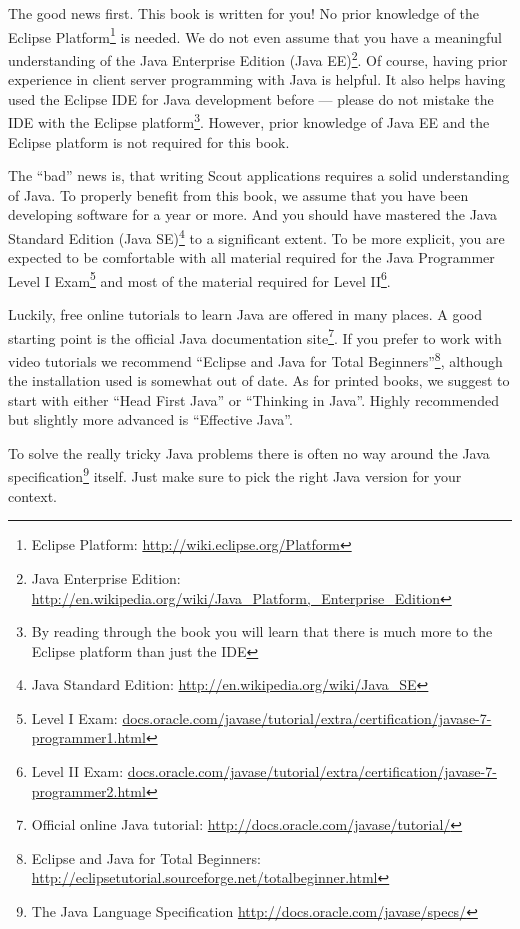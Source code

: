 \documentclass[a4paper,10pt,twoside]{book}
\begin{document}
The good news first.
This book is written for you! 
No prior knowledge of the Eclipse Platform\footnote{Eclipse Platform: \url{http://wiki.eclipse.org/Platform}} is needed. 
We do not even assume that you have a meaningful understanding of the Java Enterprise Edition 
(Java EE)\footnote{Java Enterprise Edition: \url{http://en.wikipedia.org/wiki/Java_Platform,_Enterprise_Edition}}.
Of course, having prior experience in client server programming with Java is helpful.
It also helps having used the Eclipse IDE for Java development before --- please do not mistake the IDE with the Eclipse 
platform\footnote{By reading through the book you will learn that there is much more to the Eclipse platform than just the IDE}.
However, prior knowledge of Java EE and the Eclipse platform is not required for this book.

The ``bad'' news is, that writing Scout applications requires a solid understanding of Java.
To properly benefit from this book, we assume that you have been developing software for a year or more.
And you should have mastered the Java Standard Edition 
(Java SE)\footnote{Java Standard Edition: \url{http://en.wikipedia.org/wiki/Java_SE}} to a significant extent. 
To be more explicit, you are expected to be comfortable with all material required for the Java Programmer Level I 
Exam\footnote{Level I Exam: \url{docs.oracle.com/javase/tutorial/extra/certification/javase-7-programmer1.html}}
and most of the material required for 
Level II\footnote{Level II Exam: \url{docs.oracle.com/javase/tutorial/extra/certification/javase-7-programmer2.html}}.

Luckily, free online tutorials to learn Java are offered in many places.
A good starting point is the official Java documentation 
site\footnote{Official online Java tutorial: \url{http://docs.oracle.com/javase/tutorial/}}.
If you prefer to work with video tutorials we recommend ``Eclipse and Java for Total 
Beginners''\footnote{Eclipse and Java for Total Beginners: \url{http://eclipsetutorial.sourceforge.net/totalbeginner.html}}, 
although the installation used is somewhat out of date.
As for printed books, we suggest to start with either ``Head First Java''\cite{batessierra05} or ``Thinking in Java''\cite{eckel06}.
Highly recommended but slightly more advanced is ``Effective Java''\cite{bloch08}.

To solve the really tricky Java problems there is often no way around the Java specification\footnote{
The Java Language Specification \url{http://docs.oracle.com/javase/specs/}
} 
itself.
Just make sure to pick the right Java version for your context.
\end{document}
